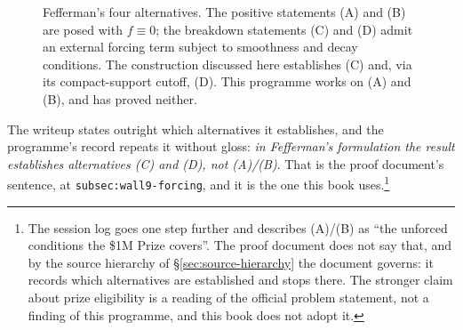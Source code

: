 \begin{figure}[ht]
\centering
{}
\caption[The four Clay alternatives]{Fefferman's four alternatives. The
positive statements (A) and (B) are posed with \(f\equiv0\); the breakdown
statements (C) and (D) admit an external forcing term subject to smoothness
and decay conditions. The construction discussed here establishes (C) and, via
its compact-support cutoff, (D). This programme works on (A) and (B), and has
proved neither.}
\label{fig:four-alternatives}
\end{figure}

The writeup states outright which alternatives it establishes, and the
programme's record repeats it without gloss: \emph{in Fefferman's formulation
the result establishes alternatives (C) and (D), not (A)/(B)}. That is the
proof document's sentence, at \texttt{subsec:wall9-forcing}, and it is the one
this book uses.\footnote{The  session log goes one step further and
describes (A)/(B) as ``the unforced conditions the \$1M Prize covers''. The
proof document does not say that, and by the source hierarchy of
\S\ref{sec:source-hierarchy} the document governs: it records which
alternatives are established and stops there. The stronger claim about prize
eligibility is a reading of the official problem statement, not a finding of
this programme, and this book does not adopt it.}

